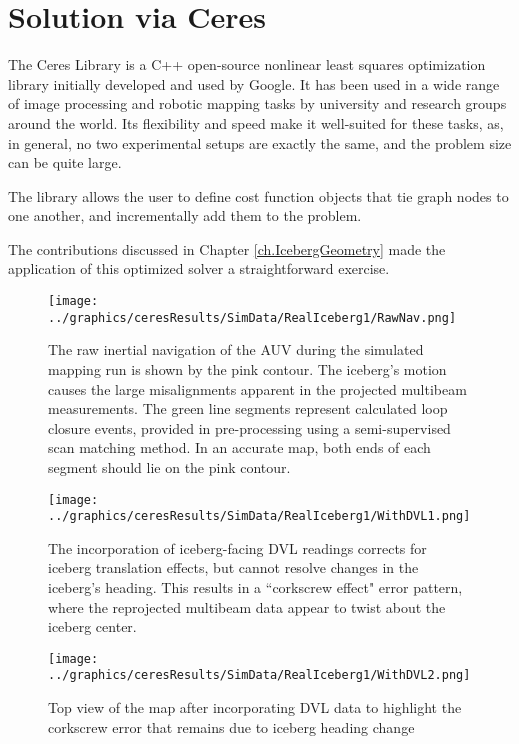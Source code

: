 \section{Solution via Ceres}

The Ceres Library is a C++ open-source nonlinear least squares optimization library initially developed and used by Google. It has been used in a wide range of image processing and robotic mapping tasks by university and research groups around the world. Its flexibility and speed make it well-suited for these tasks, as, in general, no two experimental setups are exactly the same, and the problem size can be quite large.  

The library allows the user to define cost function objects that tie graph nodes to one another, and incrementally add them to the problem. 

The contributions discussed in Chapter \ref{ch.IcebergGeometry} made the application of this optimized solver a straightforward exercise. 

 \begin{figure}[htbp]
   \centering
   \texttt{[image: ../graphics/ceresResults/SimData/RealIceberg1/RawNav.png]} %
   \caption{The raw inertial navigation of the AUV during the simulated mapping run is shown by the pink contour. The iceberg's motion causes the large misalignments apparent in the projected multibeam measurements. The green line segments represent calculated loop closure events, provided in pre-processing using a semi-supervised scan matching method. In an accurate map, both ends of each segment should lie on the pink contour.}
   \label{fig:RawNav}
\end{figure}

 \begin{figure}[htbp]
   \centering
   \texttt{[image: ../graphics/ceresResults/SimData/RealIceberg1/WithDVL1.png]} %
   \caption{The incorporation of iceberg-facing DVL readings corrects for iceberg translation effects, but cannot resolve changes in the iceberg's heading. This results in a ``corkscrew effect" error pattern, where the reprojected multibeam data appear to twist about the iceberg center.}
   \label{fig:WithDVL1}
\end{figure}

 \begin{figure}[htbp]
   \centering
   \texttt{[image: ../graphics/ceresResults/SimData/RealIceberg1/WithDVL2.png]} %
   \caption{Top view of the map after incorporating DVL data to highlight the corkscrew error that remains due to iceberg heading change}
   \label{fig:WithDVL2}
\end{figure}


